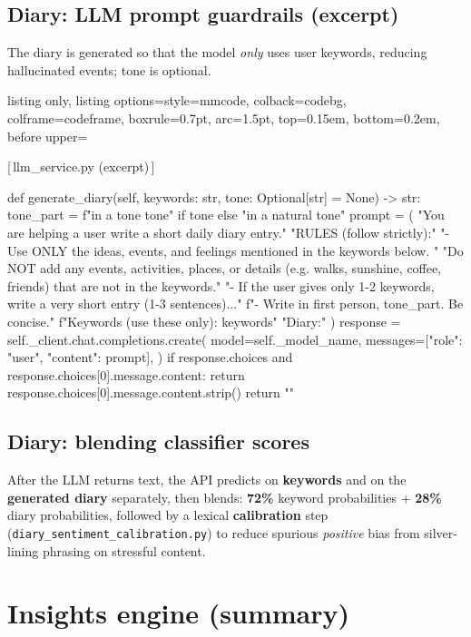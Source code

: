 \documentclass[11pt,a4paper]{article}
\newcommand{\CodeFilename}[1]{\vspace{-0.25em}\begin{center}\scriptsize\color{MMnavyL!80!black}\textsf{[\,#1\,]}\end{center}\vspace{-0.2em}}
\begin{document}
\subsection{Diary: LLM prompt guardrails (excerpt)}
The diary is generated so that the model \emph{only} uses user keywords, reducing hallucinated events; tone is optional.
\begin{tcblisting}{listing only, listing options={style=mmcode},
  colback=codebg, colframe=codeframe, boxrule=0.7pt, arc=1.5pt, top=0.15em, bottom=0.2em,
  before upper={\CodeFilename{llm\_service.py (excerpt)}}
}
def generate_diary(self, keywords: str, tone: Optional[str] = None) -> str:
    tone_part = f"in a {tone} tone" if tone else "in a natural tone"
    prompt = (
        "You are helping a user write a short daily diary entry.\n\n"
        "RULES (follow strictly):\n"
        "- Use ONLY the ideas, events, and feelings mentioned in the keywords below. "
        "Do NOT add any events, activities, places, or details (e.g. walks, sunshine, coffee, friends) that are not in the keywords.\n"
        "- If the user gives only 1-2 keywords, write a very short entry (1-3 sentences)...\n"
        f"- Write in first person, {tone_part}. Be concise.\n\n"
        f"Keywords (use these only): {keywords}\n\n"
        "Diary:"
    )
    response = self._client.chat.completions.create(
        model=self._model_name,
        messages=[{"role": "user", "content": prompt}],
    )
    if response.choices and response.choices[0].message.content:
        return response.choices[0].message.content.strip()
    return ""
\end{tcblisting}

\subsection{Diary: blending classifier scores}
After the LLM returns text, the API predicts on \textbf{keywords} and on the \textbf{generated diary} separately, then blends: \textbf{72\%} keyword probabilities + \textbf{28\%} diary probabilities, followed by a lexical \textbf{calibration} step (\texttt{diary\_sentiment\_calibration.py}) to reduce spurious \emph{positive} bias from silver-lining phrasing on stressful content.

\section{Insights engine (summary)}
\label{sec:insights-engine}
\end{document}
